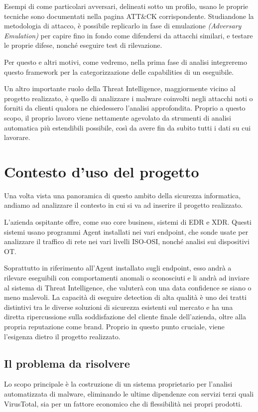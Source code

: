 Esempi di come particolari avversari, delineati sotto un profilo, usano le proprie tecniche sono documentati nella pagina ATT\&CK corrispondente.
Studiandone la metodologia di attacco, è possibile replicarlo in fase di emulazione \emph{(Adversary Emulation)} per capire fino in fondo come difendersi da attacchi similari, e testare le proprie difese, nonché eseguire test di rilevazione.

Per questo e altri motivi, come vedremo, nella prima fase di analisi integreremo questo framework per la categorizzazione delle capabilities di un eseguibile.

\medskip

Un altro importante ruolo della Threat Intelligence, maggiormente vicino al progetto realizzato, è quello di analizzare i malware coinvolti negli attacchi noti o forniti da clienti qualora ne chiedessero l'analisi approfondita. Proprio a questo scopo, il proprio lavoro viene nettamente agevolato da strumenti di analisi automatica più estendibili possibile, così da avere fin da subito tutti i dati su cui lavorare.

\section{Contesto d'uso del progetto}
Una volta vista una panoramica di questo ambito della sicurezza informatica,
andiamo ad analizzare il contesto in cui si va ad inserire il progetto realizzato.

L'azienda ospitante offre, come suo core business, sistemi di EDR e XDR.
Questi sistemi usano programmi Agent installati nei vari endpoint, che sonde usate per analizzare il traffico di rete nei vari livelli ISO-OSI, nonché analisi sui dispositivi OT.

Soprattutto in riferimento all'Agent installato sugli endpoint, esso andrà a rilevare eseguibili con comportamenti anomali o sconosciuti e li andrà ad inviare al sistema di Threat Intelligence, che valuterà con una data confidence se siano o meno malevoli.
La capacità di eseguire detection di alta qualità è uno dei tratti distintivi tra le diverse soluzioni di sicurezza esistenti sul mercato e ha una diretta ripercussione sulla soddisfazione del cliente finale dell'azienda, oltre alla propria reputazione come brand.
Proprio in questo punto cruciale, viene l'esigenza dietro il progetto realizzato.

\subsection{Il problema da risolvere}
Lo scopo principale è la costruzione di un sistema proprietario per l'analisi automatizzata di malware, eliminando le ultime dipendenze con servizi terzi quali VirusTotal, sia per un fattore economico che di flessibilità nei propri prodotti.

